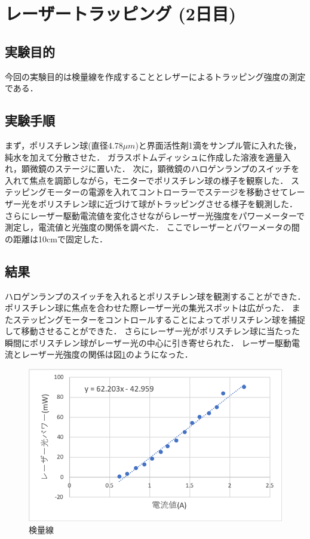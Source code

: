 \documentclass[11pt, a4paper,twocolumn]{jarticle}
\begin{document}
\section{レーザートラッピング (2日目)}
\subsection{実験目的}
今回の実験目的は検量線を作成することとレザーによるトラッピング強度の測定である．

\subsection{実験手順}
まず，ポリスチレン球(直径4.78${\mu}m$)と界面活性剤1滴をサンプル管に入れた後，純水を加えて分散させた．
ガラスボトムディッシュに作成した溶液を適量入れ，顕微鏡のステージに置いた．
次に，顕微鏡のハロゲンランプのスイッチを入れて焦点を調節しながら，モニターでポリスチレン球の様子を観察した．
ステッピングモーターの電源を入れてコントローラーでステージを移動させてレーザー光をポリスチレン球に近づけて球がトラッピングさせる様子を観測した．
さらにレーザー駆動電流値を変化させながらレーザー光強度をパワーメーターで測定し，電流値と光強度の関係を調べた．
ここでレーザーとパワーメータの間の距離は10cmで固定した．

\subsection{結果}
ハロゲンランプのスイッチを入れるとポリスチレン球を観測することができた．
ポリスチレン球に焦点を合わせた際レーザー光の集光スポットは広がった．
またステッピングモーターをコントロールすることによってポリスチレン球を捕捉して移動させることができた．
さらにレーザー光がポリスチレン球に当たった瞬間にポリスチレン球がレーザー光の中心に引き寄せられた．
レーザー駆動電流とレーザー光強度の関係は図\ref{fig:3}のようになった．

\begin{figure}[htbp]
 \begin{center}
  \includegraphics[width=0.8\linewidth]{fig3.png}
 \end{center}
 \caption{検量線}
 \label{fig:3}
\end{figure}
\end{document}
